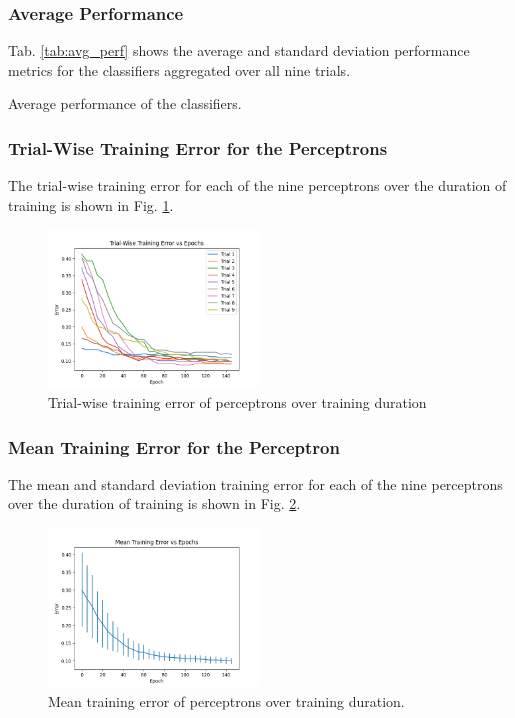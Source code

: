 \documentclass[a4paper, 11pt, titlepage]{article}
\newcommand{\figRef}[1]{Fig. \ref{#1}}
\newcommand{\tabRef}[1]{Tab. \ref{#1}}
\begin{document}
  \subsubsection{Average Performance}
  \par \tabRef{tab:avg_perf} shows the average and standard deviation
  performance metrics for the classifiers aggregated over all nine trials.
  \begin{table}[htb]
    \caption{Average performance of the classifiers.}
    \begin{center}
    \end{center}
    \label{tab:avg_perf}
  \end{table}
  \subsubsection{Trial-Wise Training Error for the Perceptrons}
  \par The trial-wise training error for each of the nine perceptrons over the
  duration of training is shown in \figRef{fig:trial_err}.
  \begin{figure}[htb]
    \centering
    \includegraphics[width=0.5\textwidth]{images/trial_wise_error.png}
    \caption{Trial-wise training error of perceptrons over training duration}
    \label{fig:trial_err}
  \end{figure}
  \subsubsection{Mean Training Error for the Perceptron}
  \par The mean and standard deviation training error for each of the nine
  perceptrons over the duration of training is shown in \figRef{fig:mean_err}.
  \begin{figure}[htb]
    \centering
    \includegraphics[width=0.5\textwidth]{images/mean_error.png}
    \caption{Mean training error of perceptrons over training duration.}
    \label{fig:mean_err}
  \end{figure}
\end{document}
